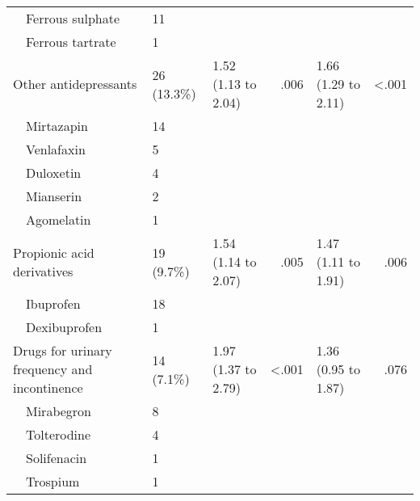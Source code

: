 \begin{table}[]
\begin{tabular}{m{7em}llrlr}
~~Ferrous sulphate                           & 11          &                             &         &                           &                \\
~~Ferrous tartrate                           & 1           &                             &         &                           &                \\
Other antidepressants                      & 26 (13.3\%) & 1.52 (1.13 to 2.04)         & .006    & 1.66 (1.29 to 2.11)       & \textless .001 \\
~~Mirtazapin                                 & 14          &                             &         &                           &                \\
~~Venlafaxin                                 & 5           &                             &         &                           &                \\
~~Duloxetin                                  & 4           &                             &         &                           &                \\
~~Mianserin                                  & 2           &                             &         &                           &                \\
~~Agomelatin                                 & 1           &                             &         &                           &                \\
Propionic acid derivatives                 & 19 (9.7\%)  & 1.54 (1.14 to 2.07)         & .005    & 1.47 (1.11 to 1.91)       & .006           \\
~~Ibuprofen                                  & 18          &                             &         &                           &                \\
~~Dexibuprofen                               & 1           &                             &         &                           &                \\
Drugs for urinary frequency and   incontinence &
  14 (7.1\%) &
  1.97 (1.37 to 2.79) &
  \textless{}.001 &
  1.36 (0.95 to 1.87) &
  .076 \\
~~Mirabegron                                 & 8           &                             &         &                           &                \\
~~Tolterodine                                & 4           &                             &         &                           &                \\
~~Solifenacin                                & 1           &                             &         &                           &                \\
~~Trospium                                   & 1           &                             &         &                           &                \\ \bottomrule
\end{tabular}
\end{table}
